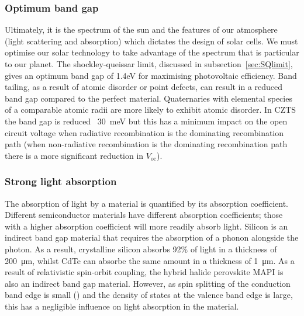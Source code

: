 \subsubsection{Optimum band gap}
Ultimately, it is the spectrum of the sun and the features of our atmosphere (light scattering and absorption) which dictates the design of solar cells. We must optimise our solar technology to take advantage of the spectrum that is particular to our planet. The shockley-queissar limit, discussed in subsection\ \ref{sec:SQlimit}, gives an optimum band gap of 1.4eV for maximising photovoltaic efficiency.\autocite{Ruhle2016}
Band tailing, as a result of atomic disorder or point defects, can result in a reduced band gap compared to the perfect material. Quaternaries with elemental species of a comparable atomic radii are more likely to exhibit atomic disorder. In CZTS the band gap is reduced ~\SI{30}{meV} but this has a minimum impact on the open circuit voltage when radiative recombination is the dominating recombination path (when non-radiative recombination is the dominating recombination path there is a more significant reduction in $V_\textrm{oc}$).\autocite{Rey2018}

\subsubsection{Strong light absorption}
The absorption of light by a material is quantified by its absorption coefficient. Different semiconductor materials have different absorption coefficients; those with a higher absorption coefficient will more readily absorb light. Silicon is an indirect band gap material that requires the absorption of a phonon alongside the photon. As a result, crystalline silicon absorbs 92\% of light in a thickness of  \SI{200}{\micro\metre}, whilst CdTe can absorbe the same amount in a thickness of \SI{1}{\micro\metre}.\autocite{Poortmans2006} As a result of relativistic spin-orbit coupling, the hybrid halide perovskite MAPI is also an indirect band gap material. However, as spin splitting of the conduction band edge is small () and the density of states at the valence band edge is large, this has a negligible influence on light absorption in the material.\autocite{Azarhoosh2016}

